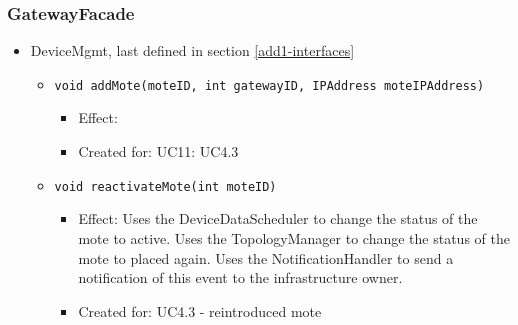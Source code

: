     \subsubsection{GatewayFacade}
        \begin{itemize}
            \item DeviceMgmt, last defined in section \ref{add1-interfaces}
            \begin{itemize}
                \item \texttt{void addMote(moteID, int gatewayID, IPAddress moteIPAddress)}
                \begin{itemize}
                    \item Effect:
                    \item Created for: UC11: UC4.3
                \end{itemize}
                \item \texttt{void reactivateMote(int moteID)}
                \begin{itemize}
                    \item Effect: Uses the DeviceDataScheduler to change the status of the mote to active.
                          Uses the TopologyManager to change the status of the mote to placed again.
                          Uses the NotificationHandler to send a notification of this event to the infrastructure owner.
                    \item Created for: UC4.3 - reintroduced mote
                \end{itemize}
            \end{itemize}
        \end{itemize}


